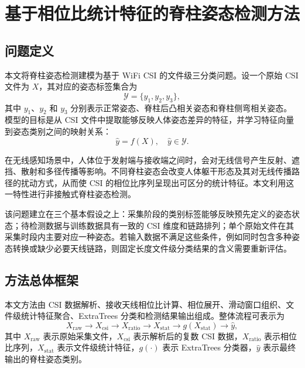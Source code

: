 ﻿%

\chapter{基于相位比统计特征的脊柱姿态检测方法}
\label{chap03}

\section{问题定义}
本文将脊柱姿态检测建模为基于 WiFi CSI 的文件级三分类问题。设一个原始 CSI 文件为 $X$，其对应的姿态标签集合为
\begin{equation}
\mathcal{Y}=\{y_1,y_2,y_3\},
\end{equation}
其中 $y_1$、$y_2$ 和 $y_3$ 分别表示正常姿态、脊柱后凸相关姿态和脊柱侧弯相关姿态。模型的目标是从 CSI 文件中提取能够反映人体姿态差异的特征，并学习特征向量到姿态类别之间的映射关系：
\begin{equation}
\hat{y}=f(X), \quad \hat{y}\in \mathcal{Y}.
\end{equation}

在无线感知场景中，人体位于发射端与接收端之间时，会对无线信号产生反射、遮挡、散射和多径传播等影响。不同脊柱姿态会改变人体躯干形态及其对无线传播路径的扰动方式，从而使 CSI 的相位比序列呈现出可区分的统计特征。本文利用这一特性进行非接触式脊柱姿态检测。

该问题建立在三个基本假设之上：采集阶段的类别标签能够反映预先定义的姿态状态；待检测数据与训练数据具有一致的 CSI 维度和链路排列；单个原始文件在其采集时段内主要对应一种姿态。若输入数据不满足这些条件，例如同时包含多种姿态转换或缺少必要天线链路，则固定长度文件级分类结果的含义需要重新评估。

\section{方法总体框架}
本文方法由 CSI 数据解析、接收天线相位比计算、相位展开、滑动窗口组织、文件级统计特征聚合、ExtraTrees 分类和检测结果输出组成。整体流程可表示为
\begin{equation}
X_{\mathrm{raw}}
\rightarrow X_{\mathrm{csi}}
\rightarrow X_{\mathrm{ratio}}
\rightarrow X_{\mathrm{stat}}
\rightarrow g(X_{\mathrm{stat}})
\rightarrow \hat{y},
\end{equation}
其中 $X_{\mathrm{raw}}$ 表示原始采集文件，$X_{\mathrm{csi}}$ 表示解析后的复数 CSI 数据，$X_{\mathrm{ratio}}$ 表示相位比序列，$X_{\mathrm{stat}}$ 表示文件级统计特征，$g(\cdot)$ 表示 ExtraTrees 分类器，$\hat{y}$ 表示最终输出的脊柱姿态类别。

